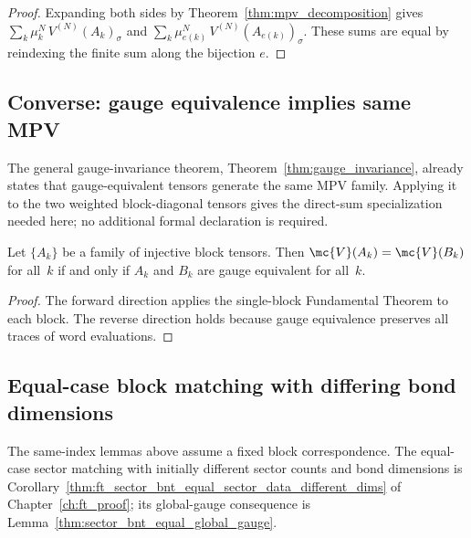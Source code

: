 \begin{proof}\leanok
    Expanding both sides by Theorem~\ref{thm:mpv_decomposition} gives
    $\sum_k \mu_k^N\,V^{(N)}(A_k)_\sigma$ and
    $\sum_k \mu_{e(k)}^N\,V^{(N)}(A_{e(k)})_\sigma$.
    These sums are equal by reindexing the finite sum along the bijection $e$.
\end{proof}

\subsection{Converse: gauge equivalence implies same MPV}%
\label{subsec:converse_gauge_mpv}

The general gauge-invariance theorem, Theorem~\ref{thm:gauge_invariance},
already states that gauge-equivalent tensors generate the same MPV family.
Applying it to the two weighted block-diagonal tensors gives the direct-sum
specialization needed here; no additional formal declaration is required.

\begin{lemma}%
    \label{lem:perBlock_sameMPV_iff_gaugeEquiv}
    \leanok
    Let $\{A_k\}$ be a family of injective block tensors.
    Then $\mc{V}(A_k) = \mc{V}(B_k)$ for all~$k$ if and only if
    $A_k$ and $B_k$ are gauge equivalent for all~$k$.
\end{lemma}

\begin{proof}\leanok{}
    The forward direction applies the single-block Fundamental Theorem to
    each block.
    The reverse direction holds because gauge equivalence preserves all
    traces of word evaluations.
\end{proof}

\subsection{Equal-case block matching with differing bond dimensions}%
\label{sec:different_bond_dimension_equal_case_ft}

The same-index lemmas above assume a fixed block correspondence. The equal-case
sector matching with initially different sector counts and bond dimensions is
Corollary~\ref{thm:ft_sector_bnt_equal_sector_data_different_dims} of
Chapter~\ref{ch:ft_proof}; its global-gauge consequence is
Lemma~\ref{thm:sector_bnt_equal_global_gauge}.

